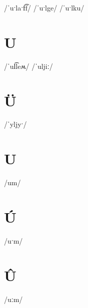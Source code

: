 \documentclass[10pt,a4paper,twoside]{book}
\begin{document}
\begin{multicols}{3}
 {/ˈuˑlaˑf͡f/} {}
 {/ˈuˑlge/} {}
 {/ˈuˑlku/} {}
\end{multicols}

\section*{U}

\begin{multicols}{3}
 {/ˈul͡leʍ/} {}
 {/ˈuljiː/} {}
\end{multicols}

\section*{Ü}

\begin{multicols}{3}
 {/ˈyljyˑ/} {}
\end{multicols}

\section*{U}

\begin{multicols}{3}
 {/um/} {}
\end{multicols}

\section*{Ú}

\begin{multicols}{3}
 {/uˑm/} {}
\end{multicols}

\section*{Û}

\begin{multicols}{3}
 {/uːm/} {}
\end{multicols}
\end{document}
